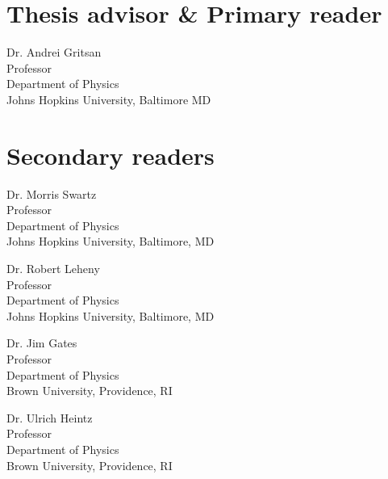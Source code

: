 

\lipsum[1-2]




\begin{singlespace}

    \section*{Thesis advisor \& Primary reader}
    
    Dr. Andrei Gritsan \\
    Professor\\
    Department of Physics\\
    Johns Hopkins University, Baltimore MD 

    \section*{Secondary readers}
    
    Dr. Morris Swartz\\
    Professor\\
    Department of Physics \\
    Johns Hopkins University, Baltimore, MD 
    
    \vspace{0.1in}
    
    Dr. Robert Leheny \\
    Professor\\
    Department of Physics \\
    Johns Hopkins University, Baltimore, MD 
    
    \vspace{0.1in}
    
    Dr. Jim Gates \\
    Professor\\
    Department of Physics \\
    Brown University, Providence, RI 
    
    \vspace{0.1in}
    
    Dr. Ulrich Heintz \\
    Professor\\
    Department of Physics \\
    Brown University, Providence, RI 



\end{singlespace}